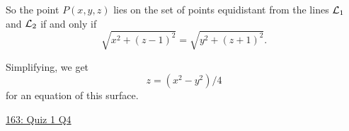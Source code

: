 \documentclass{ximera}
\begin{document}
\begin{question}
\begin{explanation}
So the point $P(x,y,z)$ lies on the set of points equidistant from the lines ${\cal L}_1$ and ${\cal L}_2$ if and only if
\[
      \sqrt{x^2 + (z-1)^2} = \sqrt{y^2 + (z+1)^2}  .
\] 

Simplifying, we get
\[
      z = \left( x^2 - y^2 \right)/4
\]
for an equation of this surface.

\begin{onlineOnly}
    \begin{center}
\end{center}
\end{onlineOnly}

\href{https://www.desmos.com/3d/cyxr2ptpcl}{163: Quiz 1 Q4}

\end{explanation}



\end{question}
\end{document}

